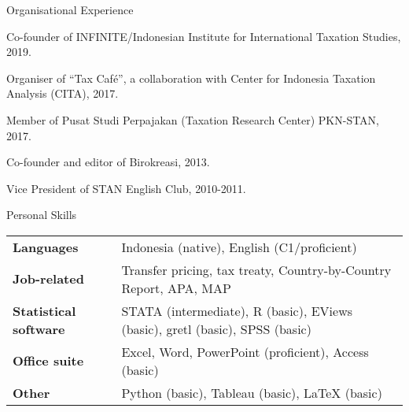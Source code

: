 \documentclass{resume}
\begin{document}
\begin{rSection}{Organisational Experience} 
\item Co-founder of INFINITE/Indonesian Institute for International Taxation Studies, 2019.
\item Organiser of “Tax Café”, a collaboration with Center for Indonesia Taxation Analysis (CITA), 2017.
\item Member of Pusat Studi Perpajakan (Taxation Research Center) PKN-STAN, 2017.
\item Co-founder and editor of Birokreasi, 2013.
\item Vice President of STAN English Club, 2010-2011.
\end{rSection}

\begin{rSection}{Personal Skills}

\begin{tabular}{p{4cm}p{12.6cm}}
\textbf{Languages} & Indonesia (native), English (C1/proficient) \\
\textbf{Job-related} & Transfer pricing, tax treaty, Country-by-Country Report, APA, MAP\\
\textbf{Statistical software} & STATA (intermediate), R (basic), EViews (basic), gretl (basic), SPSS (basic) \\
\textbf{Office suite} & Excel, Word, PowerPoint (proficient), Access (basic)\\
\textbf{Other} & Python (basic), Tableau (basic), {\LaTeX} (basic)\\

\end{tabular}

\end{rSection}
\end{document}
